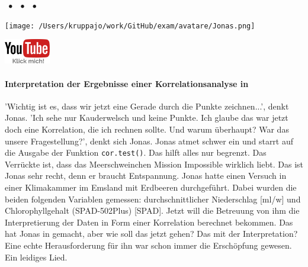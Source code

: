 \documentclass[a4paper, 9pt]{scrartcl}\usepackage[]{graphicx}\usepackage[]{xcolor}
\begin{document}
 
\ifcollection
\begin{flushright}
\tiny\vspace{-3Ex}
\textbf{\examinhaltstart}
\exammodulestat $\;\bullet$
\exammodulestatbbv $\;\bullet$
\exammodulestatversuch $\;\bullet$
\exammodulebiostat
\vspace{-4Ex}
\end{flushright}
\begin{minipage}[t]{0.5\textwidth}
\texttt{[image: /Users/kruppajo/work/GitHub/exam/avatare/Jonas.png]}
\end{minipage}
\begin{minipage}[t]{0.5\textwidth}
\hfill
\href{https://youtu.be/C9skfFRTHhI}{\includegraphics[width = 2cm]{img/youtube}}
\end{minipage}
\vspace{-3ex}
\fi



\ifcollection
\paragraph{Interpretation der Ergebnisse einer Korrelationsanalyse in \Rlogo}
\fi

'Wichtig ist es, dass wir jetzt eine Gerade durch die Punkte zeichnen...', denkt Jonas. 'Ich sehe nur Kauderwelsch und keine Punkte. Ich glaube das war jetzt doch eine Korrelation, die ich rechnen sollte. Und warum überhaupt? War das unsere Fragestellung?', denkt sich Jonas. Jonas atmet schwer ein und starrt auf die \Rlogo Ausgabe der Funktion \texttt{cor.test()}. Das hilft alles nur begrenzt. Das Verrückte ist, dass das Meerschweinchen Mission Impossible wirklich liebt. Das ist Jonas sehr recht, denn er braucht Entspannung. Jonas hatte einen Versuch in einer Klimakammer im Emsland mit Erdbeeren durchgeführt. Dabei wurden die beiden folgenden Variablen gemessen: durchschnittlicher Niederschlag [ml/w] und Chlorophyllgehalt (SPAD-502Plus) [SPAD]. Jetzt will die Betreuung von ihm die Interpretierung der Daten in Form einer Korrelation berechnet bekommen. Das hat Jonas in \Rlogo gemacht, aber wie soll das jetzt gehen? Das mit der Interpretation?  Eine echte Herausforderung für ihn war schon immer die Erschöpfung gewesen. Ein leidiges Lied. 
\end{document}
